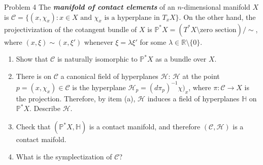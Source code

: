 \begin{thing4}{Problem 4}\leavevmode
	The \textit{\textbf{manifold of contact elements}} of an $n$-dimensional manifold $X$ is $\mathcal{C}=\{(x,\chi_x):x \in X\text{ and } \chi_x \text{ is a hyperplane in $T_xX$} \}$. On the other hand, the projectivization of the cotangent bundle of $X$ is $\mathbb{P}^* X=(T^* X\setminus \text{zero section})/\sim$, where $(x,\xi)\sim(x,\xi')$ whenever $\xi=\lambda\xi'$ for some $\lambda \in \mathbb{R}\setminus\{0\}$.
\begin{enumerate}[label=(\alph*)]
\item Show that $\mathcal{C}$ is naturally isomorphic to $\mathbb{P}^*X$ as a bundle over $X$.
\item There is on $\mathcal{C}$ a canonical field of hyperplanes $ \mathcal{H}$: $\mathcal{H}$ at the point $p=(x,\chi_x)\in \mathcal{C}$ is the hyperplane $\mathcal{H}_p=(d\pi_p)^{-1}\chi)_x$, where $\pi:\mathcal{C} \to X$ is the projection. Therefore, by item (a),  $\mathcal{H}$ induces a field of hyperplanes $\mathbb{H}$ on $\mathbb{P}^*X$. Describe $\mathcal{H}$.
\item Check that $(\mathbb{P}^* X,\mathbb{H})$ is a contact manifold, and therefore $(\mathcal{C}, \mathcal{H})$ is a contact maifold.
\item What is the symplectization of $\mathcal{C}$?
\end{enumerate}
\end{thing4}

